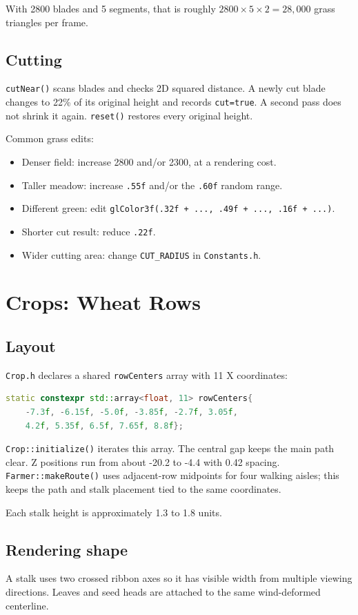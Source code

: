\documentclass[11pt,a4paper,openany]{book}
\newcommand{\code}[1]{\texttt{#1}}
\newcommand{\file}[1]{\nolinkurl{#1}}
\begin{document}
With 2800 blades and 5 segments, that is roughly \(2800\times5\times2=28{,}000\) grass triangles per frame.

\section{Cutting}
\code{cutNear()} scans blades and checks 2D squared distance. A newly cut blade changes to 22\% of its original height and records \code{cut=true}. A second pass does not shrink it again. \code{reset()} restores every original height.

\begin{editbox}
	Common grass edits:
	\begin{itemize}
		\item Denser field: increase 2800 and/or 2300, at a rendering cost.
		\item Taller meadow: increase \code{.55f} and/or the \code{.60f} random range.
		\item Different green: edit \code{glColor3f(.32f + ..., .49f + ..., .16f + ...)}.
		\item Shorter cut result: reduce \code{.22f}.
		\item Wider cutting area: change \code{CUT_RADIUS} in \file{Constants.h}.
	\end{itemize}
\end{editbox}

\chapter{Crops: Wheat Rows}
\section{Layout}
\file{Crop.h} declares a shared \code{rowCenters} array with 11 X coordinates:
\begin{lstlisting}[language=C++]
static constexpr std::array<float, 11> rowCenters{
    -7.3f, -6.15f, -5.0f, -3.85f, -2.7f, 3.05f,
    4.2f, 5.35f, 6.5f, 7.65f, 8.8f};
\end{lstlisting}
\code{Crop::initialize()} iterates this array. The central gap keeps the main path clear. Z positions run from about -20.2 to -4.4 with 0.42 spacing. \code{Farmer::makeRoute()} uses adjacent-row midpoints for four walking aisles; this keeps the path and stalk placement tied to the same coordinates.

Each stalk height is approximately 1.3 to 1.8 units.

\section{Rendering shape}
A stalk uses two crossed ribbon axes so it has visible width from multiple viewing directions. Leaves and seed heads are attached to the same wind-deformed centerline.
\end{document}
